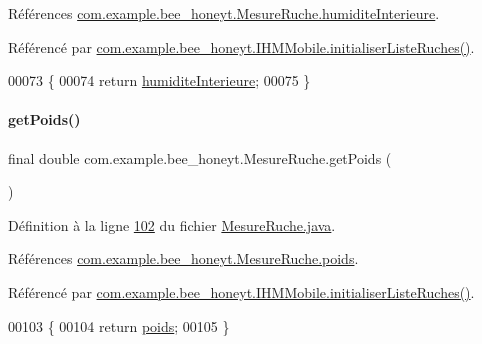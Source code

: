 Références \hyperlink{_mesure_ruche_8java_source_l00019}{com.\+example.\+bee\+\_\+honeyt.\+Mesure\+Ruche.\+humidite\+Interieure}.



Référencé par \hyperlink{_i_h_m_mobile_8java_source_l00170}{com.\+example.\+bee\+\_\+honeyt.\+I\+H\+M\+Mobile.\+initialiser\+Liste\+Ruches()}.


\begin{DoxyCode}
00073     \{
00074         \textcolor{keywordflow}{return} \hyperlink{classcom_1_1example_1_1bee__honeyt_1_1_mesure_ruche_a3b5d2536649e0acaf1eebeba4409c9bb}{humiditeInterieure};
00075     \}
\end{DoxyCode}
\mbox{\label{classcom_1_1example_1_1bee__honeyt_1_1_mesure_ruche_aff130b4038e223f3ec83769fc354a007}} 
\paragraph{\texorpdfstring{get\+Poids()}{getPoids()}}
{\footnotesize\ttfamily final double com.\+example.\+bee\+\_\+honeyt.\+Mesure\+Ruche.\+get\+Poids (\begin{DoxyParamCaption}{ }\end{DoxyParamCaption})}



Définition à la ligne \hyperlink{_mesure_ruche_8java_source_l00102}{102} du fichier \hyperlink{_mesure_ruche_8java_source}{Mesure\+Ruche.\+java}.



Références \hyperlink{_mesure_ruche_8java_source_l00022}{com.\+example.\+bee\+\_\+honeyt.\+Mesure\+Ruche.\+poids}.



Référencé par \hyperlink{_i_h_m_mobile_8java_source_l00170}{com.\+example.\+bee\+\_\+honeyt.\+I\+H\+M\+Mobile.\+initialiser\+Liste\+Ruches()}.


\begin{DoxyCode}
00103     \{
00104         \textcolor{keywordflow}{return} \hyperlink{classcom_1_1example_1_1bee__honeyt_1_1_mesure_ruche_a9aa6c575b7b69c4fb3825944e1f50722}{poids};
00105     \}
\end{DoxyCode}
\mbox{\label{classcom_1_1example_1_1bee__honeyt_1_1_mesure_ruche_a68c21cc141b1103fb3746075657bd4fd}} 
